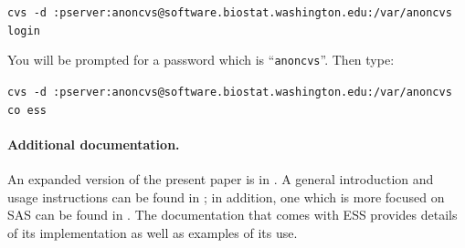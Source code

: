 \documentclass{article}
\newcommand{\stexttt}[1]{{\small\texttt{#1}}}
\begin{document}
\stexttt{cvs -d
  :pserver:anoncvs@software.biostat.washington.edu:/var/anoncvs login}
  
You will be prompted for a password which is ``\stexttt{anoncvs}''.
Then type:

\stexttt{cvs -d
  :pserver:anoncvs@software.biostat.washington.edu:/var/anoncvs co
  ess}

\paragraph{Additional documentation.} 

An expanded version of the present paper is in \citep{RMHHS:2001}.  A
general introduction and usage instructions can be found in
\citep{heiberger:dsc:2001}; in addition, one which is more focused on
SAS can be found in \citep{heiberger:philasugi:2001}.  The
documentation that comes with ESS provides details of its
implementation as well as examples of its use.
\end{document}
